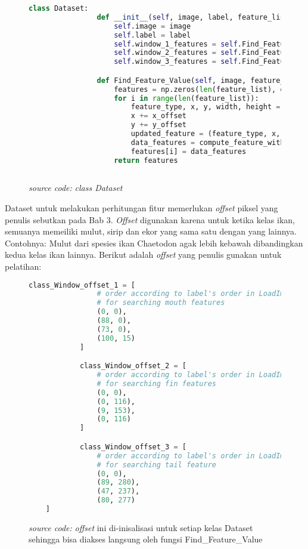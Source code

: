 	\begin{figure}[H]
		\begin{lstlisting}[language=Python, basicstyle=\tiny]
			class Dataset:
				def __init__(self, image, label, feature_list):
					self.image = image
					self.label = label
					self.window_1_features = self.Find_Feature_Value(image, feature_list, self.class_Window_offset_1[label][0], self.class_Window_offset_1[label][1])
					self.window_2_features = self.Find_Feature_Value(image, feature_list, self.class_Window_offset_2[label][0], self.class_Window_offset_2[label][1])
					self.window_3_features = self.Find_Feature_Value(image, feature_list, self.class_Window_offset_3[label][0], self.class_Window_offset_3[label][1])

				def Find_Feature_Value(self, image, feature_list, x_offset, y_offset):
					features = np.zeros(len(feature_list), dtype=object)
					for i in range(len(feature_list)):
						feature_type, x, y, width, height = feature_list[i]
						x += x_offset
						y += y_offset
						updated_feature = (feature_type, x, y, width, height)
						data_features = compute_feature_with_matrix(image, 0, updated_feature)
						features[i] = data_features
					return features
				
		\end{lstlisting}
		\caption{\emph{source code:} \textit{class Dataset}}
		\label{code:Dataset class}
	\end{figure}

	Dataset untuk melakukan perhitungan fitur memerlukan \textit{offset} piksel yang penulis 
	sebutkan pada Bab 3. \textit{Offset} digunakan karena untuk ketika kelas ikan, semuanya memeiliki 
	mulut, sirip dan ekor yang sama satu dengan yang lainnya. Contohnya: Mulut dari spesies ikan Chaetodon 
	agak lebih kebawah dibandingkan kedua kelas ikan lainnya. Berikut adalah \textit{offset} yang penulis gunakan 
	untuk pelatihan:

	\begin{figure}[H]
		\begin{lstlisting}[language=Python, basicstyle=\tiny]
			class_Window_offset_1 = [
				# order according to label's order in LoadImages
				# for searching mouth features
				(0, 0),
				(88, 0), 
				(73, 0),
				(100, 15)
			]

			class_Window_offset_2 = [
				# order according to label's order in LoadImages
				# for searching fin features
				(0, 0),
				(0, 116), 
				(9, 153),
				(0, 116)
			]

			class_Window_offset_3 = [
				# order according to label's order in LoadImages
				# for searching tail feature
				(0, 0),
				(89, 280), 
				(47, 237),
				(80, 277)
    ]
		\end{lstlisting}
		\caption{\emph{source code:} \textit{offset} ini di-inisalisasi untuk setiap kelas Dataset 
		sehingga bisa diakses langsung oleh fungsi Find\_Feature\_Value}
		\label{code:Training sub-window offset}
	\end{figure}

